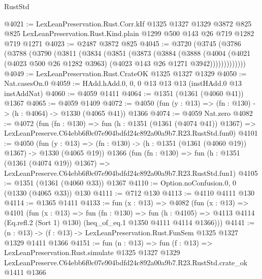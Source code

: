 \begin{lexlean}{RustStd}
\begin{coremodule}
@4021 := LexLeanPreservation.Rust.Corr.kIf
    @1325
    @1327
    @1329
    @3872
    @825
    @825
    LexLeanPreservation.Rust.Kind.plain
    @1299
    @500
    @143
    @26
    @719
    @1282
    @719
    @1271
@4023 := @2487 @3872 @825
@4045 := @3720
    (@3745
      (@3786
        (@3788
          (@3790
            (@3811
              (@3834
                (@3851
                  (@3873
                    (@3884
                      (@3888
                        (@4004
                          (@4021
                            (@4023 @500 @26 @1282 @3963)
                            (@4023 @143 @26 @1271 @3942)))))))))))))
@4049 := LexLeanPreservation.Rust.CrateOK @1325 @1327 @1329
@4050 := Nat.casesOn.{0}
@4059 := HAdd.hAdd.{0, 0, 0} @13 @13 @13 (instHAdd.{0} @13 instAddNat)
@4060 := @4059 @1411
@4064 := @1351 (@1361 (@4060 @41)) @1367
@4065 := @4059 @1409
@4072 := @4050 (fun (y : @13) => (fn : @130) -> (h : @4064) -> @1330 (@4065 @41)) @1366
@4074 := @4059 Nat.zero
@4082 := @4072
    (fun (fn : @130) =>
    fun (h : @1351 (@1361 (@4074 @41)) @1367) =>
    LexLeanPreserve.C64ebb6f0c07e904bdfd24c892a00a9b7.R23.RustStd.fun0)
@4101 := @4050
    (fun (y : @13) => (fn : @130) -> (h : @1351 (@1361 (@4060 @19)) @1367) -> @1330 (@4065 @19))
    @1366
    (fun (fn : @130) =>
    fun (h : @1351 (@1361 (@4074 @19)) @1367) =>
    LexLeanPreserve.C64ebb6f0c07e904bdfd24c892a00a9b7.R23.RustStd.fun1)
@4105 := @1351 (@1361 (@4060 @33)) @1367
@4110 := Option.noConfusion.{0, 0} (@1330 (@4065 @33)) @130
@4111 := @712 @130
@4113 := @4110 @4111 @130
@4114 := @1365 @1411
@4133 := fun (x : @13) =>
  @4082
    (fun (x : @13) =>
    @4101
      (fun (x : @13) =>
      fun (fn : @130) =>
      fun (h : @4105) =>
      @4113 @4114 (Eq.refl.{2} (Sort 1) @130) (heq_of_eq.{1} @1350 @4111 @4114 @1366)))
@4141 := (n : @13) -> (f : @13) -> LexLeanPreservation.Rust.FunSem @1325 @1327 @1329 @1411 @1366
@4151 := fun (n : @13) =>
  fun (f : @13) =>
  LexLeanPreservation.Rust.simulate
    @1325
    @1327
    @1329
    LexLeanPreserve.C64ebb6f0c07e904bdfd24c892a00a9b7.R23.RustStd.crate_ok
    @1411
    @1366
\end{coremodule}
\end{lexlean}
